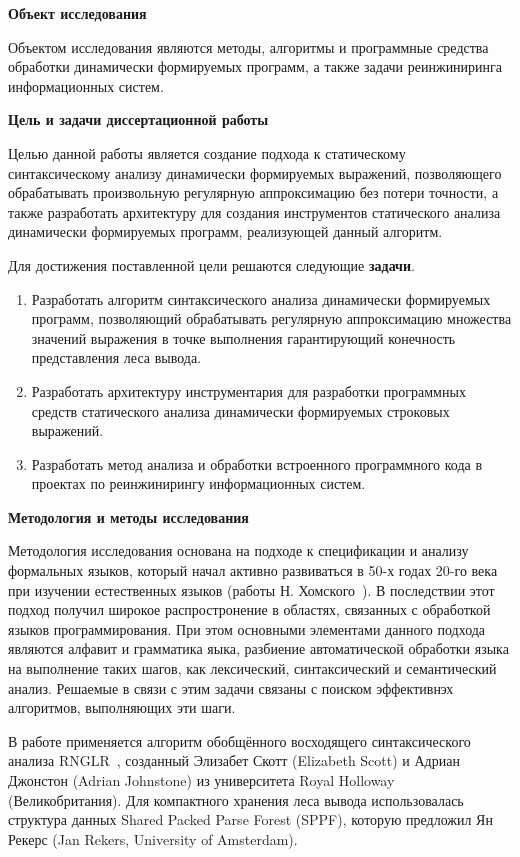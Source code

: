 \textbf{Объект исследования}

 Объектом исследования являются методы, алгоритмы и программные средства обработки динамически формируемых программ, а также задачи реинжиниринга информационных систем.

\textbf{Цель и задачи диссертационной работы}

Целью данной работы является создание подхода к статическому синтаксическому анализу динамически формируемых выражений, позволяющего обрабатывать произвольную регулярную аппроксимацию без потери точности, а также разработать архитектуру для создания инструментов статического анализа динамически формируемых программ, реализующей данный алгоритм.

Для достижения поставленной цели решаются следующие \textbf{задачи}.
\begin{enumerate}
    \item Разработать алгоритм синтаксического анализа динамически формируемых программ, позволяющий обрабатывать регулярную аппроксимацию множества значений выражения в точке выполнения гарантирующий конечность представления леса вывода.
    \item Разработать архитектуру инструментария для разработки программных средств статического анализа динамически формируемых строковых выражений.
    \item Разработать метод анализа и обработки встроенного программного кода в проектах по реинжинирингу информационных систем.
\end{enumerate}

\textbf{Методология и методы исследования}

Методология исследования основана на подходе к спецификации и анализу формальных языков, который начал активно развиваться в 50-х годах 20-го века при изучении естественных языков (работы Н. Хомского~\cite{chomskyMethod ,chomskySyntactic}). В последствии этот подход получил широкое распростронение в областях, связанных с обработкой языков программирования.
При этом основными элементами данного подхода являются алфавит и грамматика яыка, разбиение автоматической обработки языка на выполнение таких шагов, как лексический, синтаксический и семантический анализ. Решаемые в связи с этим задачи связаны с поиском эффективнэх алгоритмов, выполняющих эти шаги. 

В работе применяется алгоритм обобщённого восходящего синтаксического анализа RNGLR~\cite{RNGLR}, созданный Элизабет Скотт (Elizabeth Scott) и Адриан Джонстон (Adrian Johnstone) из университета Royal Holloway (Великобритания). Для компактного хранения леса вывода использовалась структура данных Shared Packed Parse Forest (SPPF), которую предложил Ян Рекерс (Jan Rekers, University of Amsterdam).

